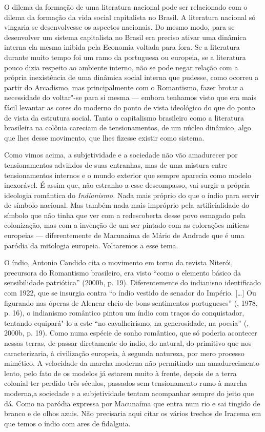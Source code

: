 O dilema da formação de uma literatura nacional pode ser relacionado com
o dilema da formação da vida social capitalista no Brasil. A literatura
nacional só vingaria se desenvolvesse os aspectos nacionais. Do mesmo
modo, para se desenvolver um sistema capitalista no Brasil era preciso
ativar uma dinâmica interna ela mesma inibida pela Economia voltada para
fora. Se a literatura durante muito tempo foi um ramo da portuguesa ou
europeia, se a literatura pouco dizia respeito ao ambiente interno, não
se pode negar relação com a própria inexistência de uma dinâmica social
interna que pudesse, como ocorreu a partir do Arcadismo, mas
principalmente com o Romantismo, fazer brotar a necessidade do voltar"-se
para si mesma --- embora tenhamos visto que era mais fácil levantar as
cores do moderno do ponto de vista ideológico do que do ponto de vista
da estrutura social. Tanto o capitalismo brasileiro como a literatura
brasileira na colônia careciam de tensionamentos, de um núcleo dinâmico,
algo que lhes desse movimento, que lhes fizesse existir como sistema.

Como vimos acima, a subjetividade e a sociedade não vão amadurecer por
tensionamentos advindos de suas entranhas, mas de uma mistura entre
tensionamentos internos e o mundo exterior que sempre aparecia como
modelo inexorável. É assim que, não estranho a esse descompasso, vai
surgir a própria ideologia romântica do \emph{Indianismo.} Nada mais
próprio do que o índio para servir de símbolo nacional. Mas também nada
mais impróprio pela artificialidade do símbolo que não tinha que ver com
a redescoberta desse povo esmagado pela colonização, mas com a invenção
de um ser pintado com as colorações míticas europeias --- diferentemente
de Macunaíma de Mário de Andrade que é uma paródia da mitologia
europeia. Voltaremos a esse tema.

O índio, Antonio Candido cita o movimento em torno da revista Niterói,
precursora do Romantismo brasileiro, era visto ``como o elemento básico
da sensibilidade patriótica'' (2000b, p. 19). Diferentemente do
indianisno identificado com 1922, que se insurgia contra ``o índio
vestido de senador do Império. [\ldots{}] Ou figurando nas óperas de
Alencar cheio de bons sentimentos portugueses'' (, 1978, p. 16),
o indianismo romântico pintou um índio com traços do conquistador,
tentando equipará"-lo a este ``no cavalheirismo, na generosidade, na
poesia'' (, 2000b, p. 19). Como numa espécie de sonho romântico,
que só poderia acontecer nessas terras, de passar diretamente do índio,
do natural, do primitivo que nos caracterizaria, à civilização europeia,
à segunda natureza, por mero processo mimético. A velocidade da marcha
moderna não permitindo um amadurecimento lento, pelo fato de os modelos
já estarem muito à frente, depois de a terra colonial ter perdido três
séculos, passados sem tensionamento rumo à marcha moderna,a sociedade
e a subjetividade tentam acompanhar sempre do jeito que dá. Como na paródia
expressa por Macunaíma que entra num rio e sai tingido de branco e de olhos azuis.
Não precisaria aqui citar os vários trechos de Iracema em que temos o
índio com ares de fidalguia.

